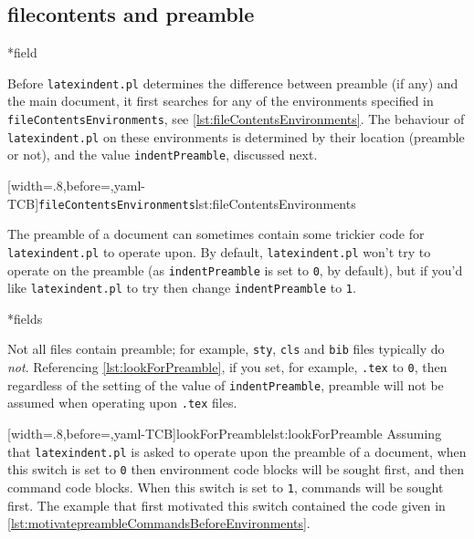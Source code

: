 \documentclass[10pt]{article}
\begin{document}
\subsection{filecontents and preamble}\label{subsec:filecontents:preamble}
*{field}

 Before \texttt{latexindent.pl} determines the difference between preamble (if any) and
 the main document, it first searches for any of the environments specified in
 \texttt{fileContentsEnvironments}, see \cref{lst:fileContentsEnvironments}. The
 behaviour of \texttt{latexindent.pl} on these environments is determined by their
 location (preamble or not), and the value \texttt{indentPreamble}, discussed next.

 [width=.8\linewidth,before=\centering,yaml-TCB]{\texttt{fileContentsEnvironments}}{lst:fileContentsEnvironments}


 The preamble of a document can sometimes contain some trickier code for
 \texttt{latexindent.pl} to operate upon. By default, \texttt{latexindent.pl} won't try
 to operate on the preamble (as \texttt{indentPreamble} is set to \texttt{0}, by
 default), but if you'd like \texttt{latexindent.pl} to try then change
 \texttt{indentPreamble} to \texttt{1}.

*{fields}

 Not all files contain preamble; for example, \texttt{sty}, \texttt{cls} and \texttt{bib}
 files typically do \emph{not}. Referencing \cref{lst:lookForPreamble}, if you set, for
 example, \texttt{.tex} to \texttt{0}, then regardless of the setting of the value of
 \texttt{indentPreamble}, preamble will not be assumed when operating upon \texttt{.tex}
 files.

 [width=.8\linewidth,before=\centering,yaml-TCB]{lookForPreamble}{lst:lookForPreamble}
 Assuming that \texttt{latexindent.pl} is asked to operate upon the preamble of a
 document, when this switch is set to \texttt{0} then environment code blocks will be
 sought first, and then command code blocks. When this switch is set to \texttt{1},
 commands will be sought first. The example that first motivated this switch contained
 the code given in \cref{lst:motivatepreambleCommandsBeforeEnvironments}.
\end{document}
